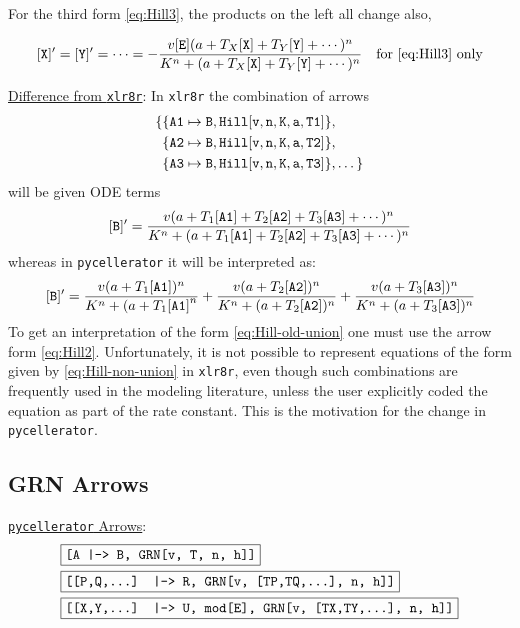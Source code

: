 For the third form \eqref{eq:Hill3}, the products on the left all change also, 

\begin{align}
&{\tt [X]'}={\tt[Y]'}=\cdots =  -\dfrac{v {\tt [E]} ( a + T_X{\tt [X]} + T_Y{\tt [Y]}+ \cdots )^n}{K^n + (a + T_X{\tt [X]} + T_Y{\tt [Y]} + \cdots)^n} & \text{for \ref{eq:Hill3} only}
\end{align}


\underline{Difference from {\tt xlr8r}}: In {\tt xlr8r} the combination of arrows
\begin{equation}
\begin{split}
\{ & \{ {\tt A1} \mapsto {\tt B}, {\tt Hill[v, n, K, a, T1]}\}, \\
   & \{ {\tt A2} \mapsto {\tt B}, {\tt Hill[v, n, K, a, T2]}\}, \\
   & \{ {\tt A3} \mapsto {\tt B}, {\tt Hill[v, n, K, a, T3]}\},    
   \dots \}
\end{split}
\end{equation}
will be given ODE terms
\begin{equation}\label{eq:Hill-old-union}
{\tt [B]'} = \dfrac{v  ( a + T_1 {\tt [A1]} +T_2 {\tt [A2]} + T_3 {\tt [A3]} + \cdots )^n}{K^n + (a + T_1 {\tt [A1]} +T_2 {\tt [A2]} + T_3 {\tt [A3]} + \cdots )^n}
\end{equation}
whereas in {\tt pycellerator} it will be interpreted as:
\begin{equation} \label{eq:Hill-non-union}
{\tt [B]'} = \dfrac{v  ( a +T_1 {\tt [A1]})^n}{K^n + (a+ T_1 {\tt [A1]}^n}
           + \dfrac{v  ( a+ T_2 {\tt [A2]})^n}{K^n + (a+T_2 {\tt [A2]})^n} 
           + \dfrac{v  ( a +T_3 {\tt [A3]})^n}{K^n + (a+ T_3 {\tt [A3]})^n}
\end{equation}
To get an interpretation of the form \eqref{eq:Hill-old-union} one must use the arrow form \eqref{eq:Hill2}. Unfortunately, it is not possible to represent equations of the form given by \eqref{eq:Hill-non-union} in {\tt xlr8r}, even though such combinations are frequently used in the modeling literature, unless the user explicitly coded the equation as part of the rate constant. This is the motivation for the change in {\tt pycellerator}. 



\subsection{GRN Arrows}
\label{section:GRN}
\underline{{\tt pycellerator} Arrows}:
\begin{align}
&\boxed{\text {\tt [A |-> B, GRN[v, T, n, h]]}}\label{eq:GRN1}\\
&\boxed{\text {\tt [[P,Q,...] |-> R, GRN[v, [TP,TQ,...], n, h]]}}\label{eq:GRN2}\\
&\boxed{\text {\tt [[X,Y,...] |--> U, mod[E], GRN[v, [TX,TY,...], n, h]]}}\label{eq:GRN3}
\end{align}

